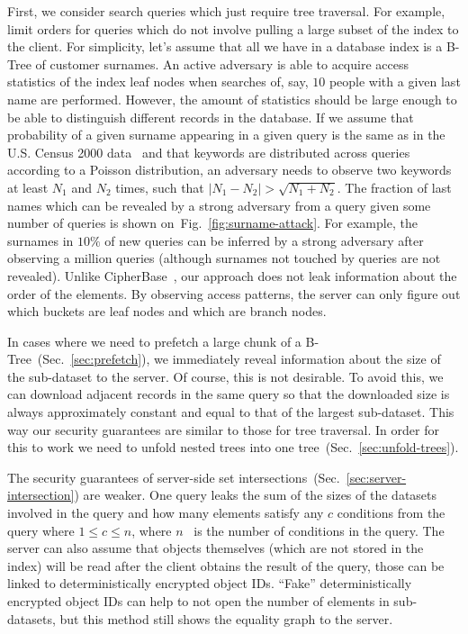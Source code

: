\documentclass[notitlepage]{revtex4-1}
\newcommand{\figref}[1]{Fig.~\ref{#1}}
\begin{document}
First, we consider search queries which just require tree traversal.
For example, limit orders for queries which do not involve pulling a large subset of the index to the client.
For simplicity, let's assume that all we have in a database index is a B-Tree of customer surnames.
An active adversary is able to acquire access statistics of the index leaf nodes when searches of, say, $10$ people with a given last name are performed.
However, the amount of statistics should be large enough to be able to distinguish different records in the database.
If we assume that probability of a given surname appearing in a given query is the same as in the U.S. Census 2000 data~\cite{us-census-surnames}
and that keywords are distributed across queries according to a Poisson distribution,
an adversary needs to observe two keywords at least $N_1$ and $N_2$ times, such that $|N_1 - N_2| > \sqrt{N_1 + N_2}$.
The fraction of last names which can be revealed by a strong adversary from a query given some number of queries is shown on~\figref{fig:surname-attack}.
For example, the surnames in $10\%$ of new queries can be inferred by a strong adversary after observing a million queries (although surnames not touched by queries are not revealed).
Unlike CipherBase~\cite{cipherbase}, our approach does not leak information about the order of the elements.
By observing access patterns, the server can only figure out which buckets are leaf nodes and which are branch nodes.

In cases where we need to prefetch a large chunk of a B-Tree~(Sec.~\ref{sec:prefetch}), we immediately reveal information about the size of the sub-dataset to the server.
Of course, this is not desirable.
To avoid this, we can download adjacent records in the same query so that the downloaded size is always approximately constant and equal to that of the largest sub-dataset.
This way our security guarantees are similar to those for tree traversal.
In order for this to work we need to unfold nested trees into one tree~(Sec.~\ref{sec:unfold-trees}).

The security guarantees of server-side set intersections~(Sec.~\ref{sec:server-intersection}) are weaker.
One query leaks the sum of the sizes of the datasets involved in the query and how many elements satisfy any $c$ conditions from the query where $1\le c\le n$, where $n$~ is the number of conditions in the query.
The server can also assume that objects themselves (which are not stored in the index) will be read after the client obtains the result of the query,
those can be linked to deterministically encrypted object IDs.
``Fake'' deterministically encrypted object IDs can help to not open the number of elements in sub-datasets, but this method still shows the equality graph to the server.
\end{document}
